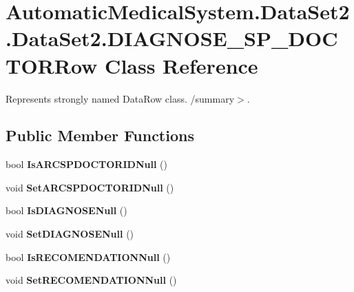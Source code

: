 \section{AutomaticMedicalSystem.DataSet2.DataSet2.DIAGNOSE\_\-SP\_\-DOCTORRow Class Reference}
\label{class_automatic_medical_system_1_1_data_set2_1_1_d_i_a_g_n_o_s_e___s_p___d_o_c_t_o_r_row}
Represents strongly named DataRow class. /summary$>$.  


\subsection*{Public Member Functions}
\begin{CompactItemize}
\item 
bool \textbf{IsARCSPDOCTORIDNull} ()\label{class_automatic_medical_system_1_1_data_set2_1_1_d_i_a_g_n_o_s_e___s_p___d_o_c_t_o_r_row_59e1755d06884e34dace09036ce8d5a2}

\item 
void \textbf{SetARCSPDOCTORIDNull} ()\label{class_automatic_medical_system_1_1_data_set2_1_1_d_i_a_g_n_o_s_e___s_p___d_o_c_t_o_r_row_520564d28b040ec539680fc21fcdac98}

\item 
bool \textbf{IsDIAGNOSENull} ()\label{class_automatic_medical_system_1_1_data_set2_1_1_d_i_a_g_n_o_s_e___s_p___d_o_c_t_o_r_row_d9adee513b748ceec7f1699b50d3da46}

\item 
void \textbf{SetDIAGNOSENull} ()\label{class_automatic_medical_system_1_1_data_set2_1_1_d_i_a_g_n_o_s_e___s_p___d_o_c_t_o_r_row_efd99f5c8ad9fa87ed193d9871a15759}

\item 
bool \textbf{IsRECOMENDATIONNull} ()\label{class_automatic_medical_system_1_1_data_set2_1_1_d_i_a_g_n_o_s_e___s_p___d_o_c_t_o_r_row_0f255ef9dc91e469c624235b525aa2b3}

\item 
void \textbf{SetRECOMENDATIONNull} ()\label{class_automatic_medical_system_1_1_data_set2_1_1_d_i_a_g_n_o_s_e___s_p___d_o_c_t_o_r_row_a0b7b8327f913e523c0b3d92764f5109}

\end{CompactItemize}
